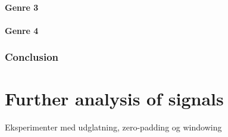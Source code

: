 \paragraph{Genre 3}

\paragraph{Genre 4}

\subsubsection{Conclusion}

\section{Further analysis of signals}
\label{sec:analysisOfSignals}
Eksperimenter med udglatning, zero-padding og windowing 

